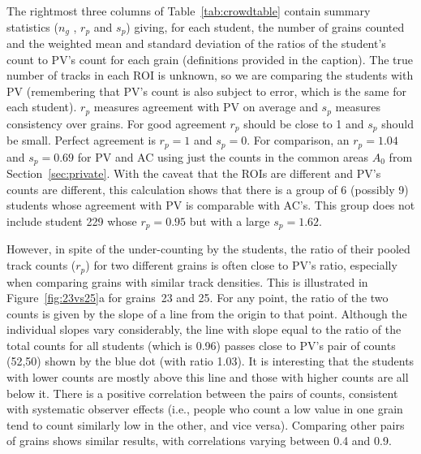 \documentclass[gchron, manuscript]{copernicus}
\begin{document}
The rightmost three columns of Table~\ref{tab:crowdtable} contain
summary statistics ($n_g$ , $r_p$ and $s_p$) giving, for each student,
the number of grains counted and the weighted mean and standard
deviation of the ratios of the student's count to PV's count for each
grain (definitions provided in the caption). The true number of tracks
in each ROI is unknown, so we are comparing the students with PV
(remembering that PV's count is also subject to error, which is the
same for each student). $r_p$ measures agreement with PV on average
and $s_p$ measures consistency over grains. For good agreement $r_p$
should be close to 1 and $s_p$ should be small.  Perfect agreement is
$r_p = 1$ and $s_p = 0$. For comparison, an $r_p = 1.04$ and $s_p =
0.69$ for PV and AC using just the counts in the common areas $A_0$
from Section~\ref{sec:private}. With the caveat that the ROIs are
different and PV's counts are different, this calculation shows that
there is a group of 6 (possibly 9) students whose agreement with PV is
comparable with AC's. This group does not include student 229 whose
$r_p = 0.95$ but with a large $s_p = 1.62$.\medskip

However, in spite of the under-counting by the students, the ratio of
their pooled track counts ($r_p$) for two different grains is often
close to PV's ratio, especially when comparing grains with similar
track densities. This is illustrated in Figure~\ref{fig:23vs25}a for
grains~23 and 25.  For any point, the ratio of the two counts is given
by the slope of a line from the origin to that point. Although the
individual slopes vary considerably, the line with slope equal to the
ratio of the total counts for all students (which is 0.96) passes
close to PV's pair of counts (52,50) shown by the blue dot (with ratio
1.03). It is interesting that the students with lower counts are
mostly above this line and those with higher counts are all below it.
There is a positive correlation between the pairs of counts,
consistent with systematic observer effects (i.e., people who count a
low value in one grain tend to count similarly low in the other, and
vice versa). Comparing other pairs of grains shows similar results,
with correlations varying between 0.4 and 0.9.\medskip
\end{document}
